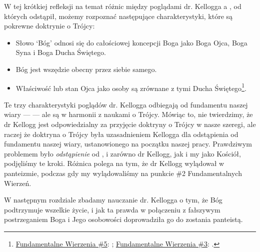 W tej krótkiej refleksji na temat różnic między poglądami dr. Kellogga a , od których odstąpił, możemy rozpoznać następujące charakterystyki, które są pokrewne doktrynie o Trójcy:

\begin{itemize}
    \item Słowo ‘Bóg’ odnosi się do całościowej koncepcji Boga jako Boga Ojca, Boga Syna i Boga Ducha Świętego.
    \item Bóg jest wszędzie obecny przez siebie samego.
    \item Właściwość lub stan Ojca jako osoby są zrównane z tymi Ducha Świętego\footnote{\href{https://www.adventist.org/wp-content/uploads/2020/06/ADV-28Beliefs2020.pdf}{Fundamentalne Wierzenia \#5}: ; \href{https://www.adventist.org/wp-content/uploads/2020/06/ADV-28Beliefs2020.pdf}{Fundamentalne Wierzenia \#3}: .}.
\end{itemize}

Te trzy charakterystyki poglądów dr. Kellogga odbiegają od fundamentu naszej wiary —  — ale są w harmonii z naukami o Trójcy. Mówiąc to, nie twierdzimy, że dr Kellogg jest odpowiedzialny za przyjęcie doktryny o Trójcy w nasze szeregi, ale raczej że doktryna o Trójcy była uzasadnieniem Kellogga dla odstąpienia od fundamentu naszej wiary, ustanowionego na początku naszej pracy. Prawdziwym problemem było \textit{odstąpienie} od , i zarówno dr Kellogg, jak i my jako Kościół, podjęliśmy te kroki. Różnica polega na tym, że dr Kellogg wylądował w panteizmie, podczas gdy my wylądowaliśmy na punkcie \#2 Fundamentalnych Wierzeń.

W następnym rozdziale zbadamy nauczanie dr. Kellogga o tym, że Bóg podtrzymuje wszelkie życie, i jak ta prawda w połączeniu z fałszywym postrzeganiem Boga i Jego osobowości doprowadziła go do zostania panteistą.


